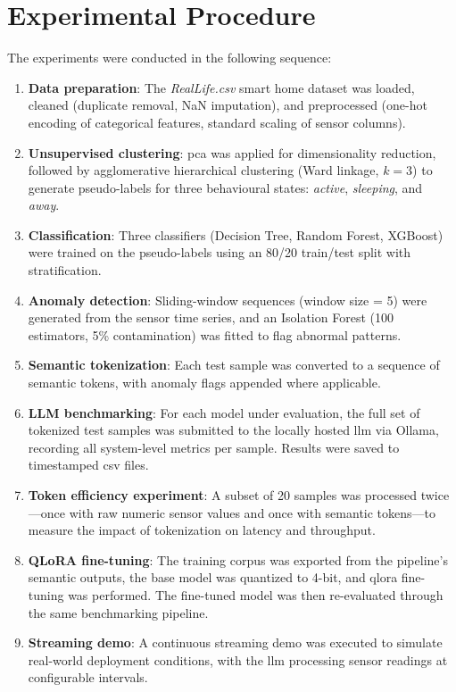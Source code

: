 \documentclass[12pt,a4paper,oneside]{report}
\begin{document}
\section{Experimental Procedure}
\label{sec:meth-procedure}

The experiments were conducted in the following sequence:

\begin{enumerate}
    \item \textbf{Data preparation}: The \textit{RealLife.csv} smart home dataset was loaded, cleaned (duplicate removal, NaN imputation), and preprocessed (one-hot encoding of categorical features, standard scaling of sensor columns).

    \item \textbf{Unsupervised clustering}: \gls{pca} was applied for dimensionality reduction, followed by agglomerative hierarchical clustering (Ward linkage, $k=3$) to generate pseudo-labels for three behavioural states: \textit{active}, \textit{sleeping}, and \textit{away}.

    \item \textbf{Classification}: Three classifiers (Decision Tree, Random Forest, XGBoost) were trained on the pseudo-labels using an 80/20 train/test split with stratification.

    \item \textbf{Anomaly detection}: Sliding-window sequences (window size = 5) were generated from the sensor time series, and an Isolation Forest (100 estimators, 5\% contamination) was fitted to flag abnormal patterns.

    \item \textbf{Semantic tokenization}: Each test sample was converted to a sequence of semantic tokens, with anomaly flags appended where applicable.

    \item \textbf{LLM benchmarking}: For each model under evaluation, the full set of tokenized test samples was submitted to the locally hosted \gls{llm} via Ollama, recording all system-level metrics per sample. Results were saved to timestamped \gls{csv} files.

    \item \textbf{Token efficiency experiment}: A subset of 20 samples was processed twice---once with raw numeric sensor values and once with semantic tokens---to measure the impact of tokenization on latency and throughput.

    \item \textbf{QLoRA fine-tuning}: The training corpus was exported from the pipeline's semantic outputs, the base model was quantized to 4-bit, and \gls{qlora} fine-tuning was performed. The fine-tuned model was then re-evaluated through the same benchmarking pipeline.

    \item \textbf{Streaming demo}: A continuous streaming demo was executed to simulate real-world deployment conditions, with the \gls{llm} processing sensor readings at configurable intervals.
\end{enumerate}
\end{document}

